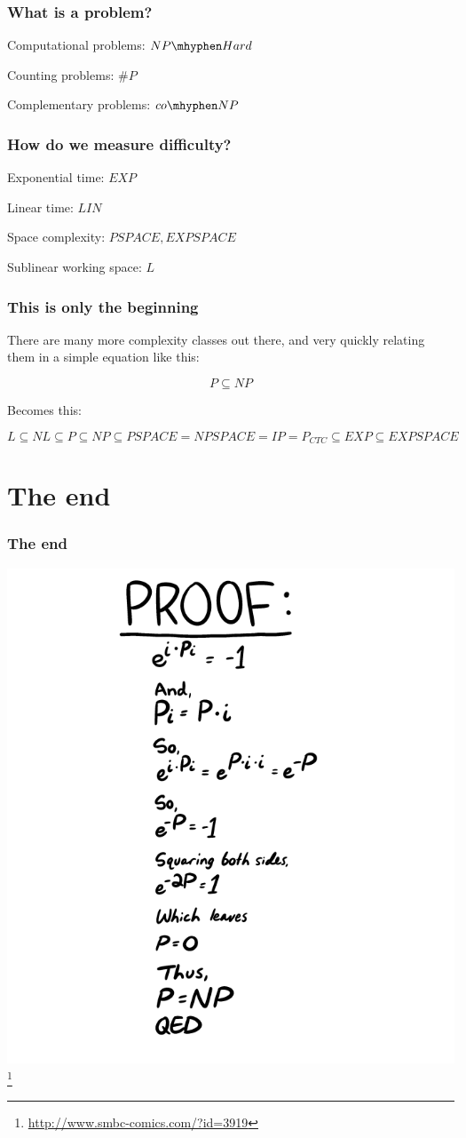 \documentclass[aspectratio=169]{beamer}
\begin{document}
\begin{frame}
\frametitle{What is a problem?}
Computational problems: $NP\mhyphen Hard$

Counting problems: $\#P$

Complementary problems: $co\mhyphen NP$
\end{frame}

\begin{frame}
\frametitle{How do we measure difficulty?}
Exponential time: $EXP$

Linear time: $LIN$

Space complexity: $PSPACE, EXPSPACE$

Sublinear working space: $L$
\end{frame}

\begin{frame}
\frametitle{This is only the beginning}
There are many more complexity classes out there, and very quickly relating them in a simple equation like this:

$$P \subseteq NP$$

Becomes this:

$$L \subseteq NL \subseteq P \subseteq NP \subseteq PSPACE = NPSPACE = IP = P_{CTC} \subseteq EXP \subseteq EXPSPACE$$
\end{frame}

\section{The end}

\begin{frame}
\begin{center}
\frametitle{The end}
\includegraphics[scale=0.2]{smbc_comic}\footnote{\url{http://www.smbc-comics.com/?id=3919}}
\end{center}
\end{frame}
\end{document}
